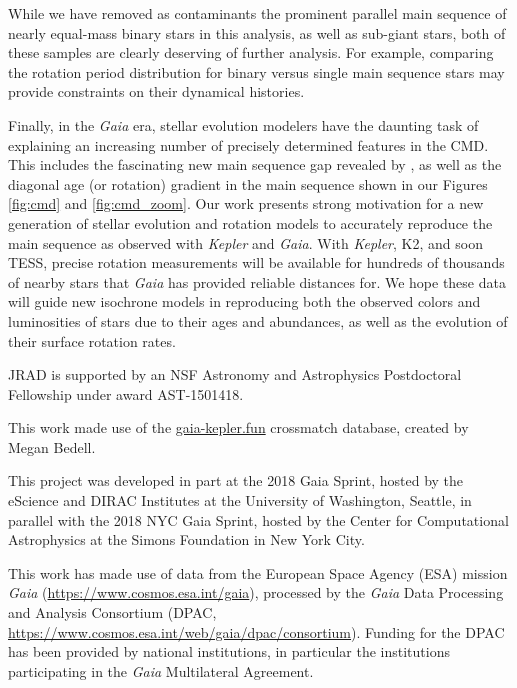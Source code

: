 \documentclass[preprint2]{aastex62}
\newcommand{\Kepler}{\textsl{Kepler}\xspace}
\begin{document}
While we have removed as contaminants the prominent parallel main sequence of nearly equal-mass binary stars in this analysis, as well as sub-giant stars, both of these samples are clearly deserving of further analysis. For example, comparing the rotation period distribution for binary versus single main sequence stars may provide constraints on their dynamical histories. 

Finally, in the {\em Gaia} era, stellar evolution modelers have the daunting task of explaining an increasing number of precisely determined features in the CMD.
This includes the fascinating new main sequence gap revealed by \citet{jao2018}, as well as the diagonal age (or rotation) gradient in the main sequence shown in our Figures \ref{fig:cmd} and \ref{fig:cmd_zoom}.
Our work presents strong motivation for a new generation of stellar evolution and rotation models to accurately reproduce the main sequence as observed with \Kepler and {\em Gaia}. With \Kepler, K2, and soon TESS, precise rotation measurements will be available for hundreds of thousands of nearby stars that {\em Gaia} has provided reliable distances for. We hope these data will guide new isochrone models in reproducing both the observed colors and luminosities of stars due to their ages and abundances, as well as the evolution of their surface rotation rates. 


\acknowledgments

JRAD is supported by an NSF Astronomy and Astrophysics Postdoctoral Fellowship under award AST-1501418. 

This work made use of the \url{gaia-kepler.fun} crossmatch database, created by Megan Bedell.

This project was developed in part at the 2018 Gaia Sprint, hosted by the eScience and DIRAC Institutes at the University of Washington, Seattle, in parallel with the 2018 NYC Gaia Sprint, hosted by the Center for Computational Astrophysics at the Simons Foundation in New York City.

This work has made use of data from the European Space Agency (ESA) mission
{\it Gaia} (\url{https://www.cosmos.esa.int/gaia}), processed by the {\it Gaia}
Data Processing and Analysis Consortium (DPAC,
\url{https://www.cosmos.esa.int/web/gaia/dpac/consortium}). Funding for the DPAC
has been provided by national institutions, in particular the institutions
participating in the {\it Gaia} Multilateral Agreement.





\end{document}
